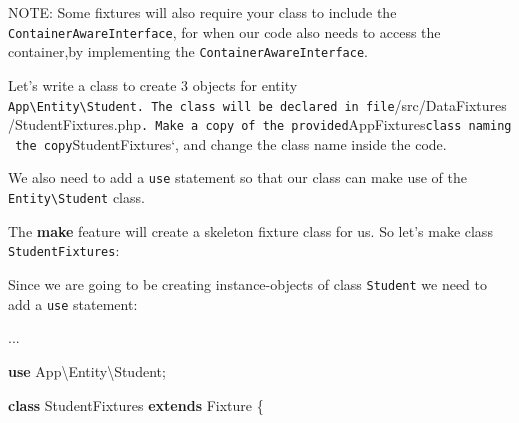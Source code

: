 \documentclass[a4paperpaper,openright]{book}
\newenvironment{Shaded}{}{}
\newcommand{\ExtensionTok}[1]{#1}
\newcommand{\KeywordTok}[1]{\textcolor[rgb]{0.00,0.44,0.13}{\textbf{#1}}}
\newcommand{\NormalTok}[1]{#1}
\newcommand{\OtherTok}[1]{\textcolor[rgb]{0.00,0.44,0.13}{#1}}
\newcommand{\StringTok}[1]{\textcolor[rgb]{0.25,0.44,0.63}{#1}}
\begin{document}
NOTE: Some fixtures will also require your class to include the
\texttt{ContainerAwareInterface}, for when our code also needs to access
the container,by implementing the \texttt{ContainerAwareInterface}.

Let's write a class to create 3 objects for entity
\texttt{App\textbackslash{}Entity\textbackslash{}Student.\ The\ class\ will\ be\ declared\ in\ file}/src/DataFixtures/StudentFixtures.php\texttt{.\ Make\ a\ copy\ of\ the\ provided}AppFixtures\texttt{class\ naming\ the\ copy}StudentFixtures`,
and change the class name inside the code.

We also need to add a \texttt{use} statement so that our class can make
use of the \texttt{Entity\textbackslash{}Student} class.

The \textbf{make} feature will create a skeleton fixture class for us.
So let's make class \texttt{StudentFixtures}:

\begin{Shaded}
\end{Shaded}

Since we are going to be creating instance-objects of class
\texttt{Student} we need to add a \texttt{use} statement:

\begin{Shaded}
\begin{Highlighting}[]
    \StringTok{...}
    
    \KeywordTok{use}\NormalTok{ App\textbackslash{}Entity\textbackslash{}Student}\OtherTok{;}
    
    \KeywordTok{class}\NormalTok{ StudentFixtures }\KeywordTok{extends}\NormalTok{ Fixture}
\NormalTok{    \{}
\end{Highlighting}
\end{Shaded}
\end{document}
